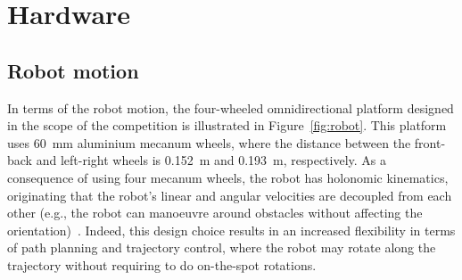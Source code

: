 \documentclass[conference]{IEEEtran}
\begin{document}
\section{Hardware}\label{sec:hw}

\subsection{Robot motion}

In terms of the robot motion, the four-wheeled omnidirectional platform designed in the scope of the competition is illustrated in Figure~\ref{fig:robot}.
This platform uses 60~mm aluminium mecanum wheels, where the distance between the front-back and left-right wheels is 0.152~m and 0.193~m, respectively.
As a consequence of using four mecanum wheels, the robot has holonomic kinematics, originating that the robot's linear and angular velocities are decoupled from each other (e.g., the robot can manoeuvre around obstacles without affecting the orientation)~\cite{book:intro-robotics}.
Indeed, this design choice results in an increased flexibility in terms of path planning and trajectory control, where the robot may rotate along the trajectory without requiring to do on-the-spot rotations.
\end{document}
